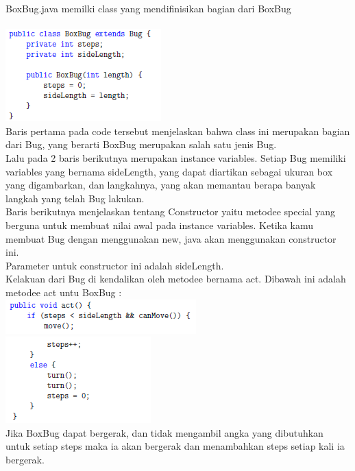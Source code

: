 \documentclass{article}
\begin{document}
	BoxBug.java memilki class yang mendifinisikan bagian dari BoxBug
	\\
	\\
	\includegraphics{B1}
	\\
	Baris pertama pada code tersebut menjelaskan bahwa class ini merupakan bagian dari Bug, yang berarti BoxBug merupakan salah satu jenis Bug.
	\\
	
	Lalu pada 2 baris berikutnya merupakan instance variables. Setiap Bug memiliki variables yang bernama sideLength, yang dapat diartikan sebagai ukuran box yang digambarkan, dan langkahnya, yang akan memantau berapa banyak langkah yang telah Bug lakukan.
	\\
	
	Baris berikutnya menjelaskan tentang Constructor yaitu metodee special yang berguna untuk membuat nilai awal pada instance variables. Ketika kamu membuat Bug dengan menggunakan new, java akan menggunakan constructor ini.
	\\
	
	Parameter untuk constructor ini adalah sideLength.
	\\
	
	Kelakuan dari Bug di kendalikan oleh metodee bernama act. Dibawah ini adalah metodee act untu BoxBug : 
	\\
	\includegraphics{C1}
	\\
	\includegraphics{C2}
	\\
	
	Jika BoxBug dapat bergerak, dan tidak mengambil angka yang dibutuhkan untuk setiap steps maka ia akan bergerak dan menambahkan steps setiap kali ia bergerak.
	\\
	
\end{document}
